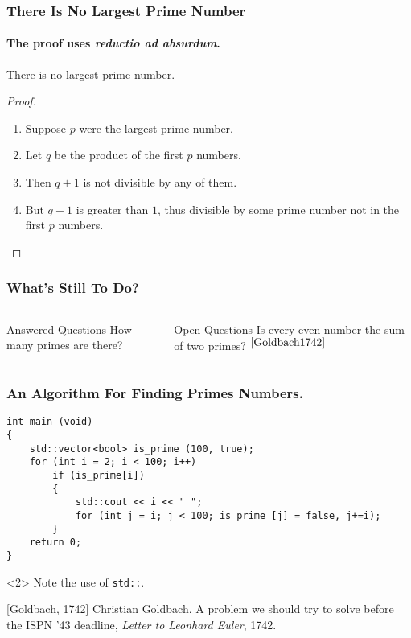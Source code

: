 \documentclass{beamer}
\begin{document}
\begin{frame}[t]
  \frametitle{There Is No Largest Prime Number}
  \framesubtitle{The proof uses \textit{reductio ad absurdum}.}
  \begin{theorem}
    There is no largest prime number.
  \end{theorem}
  \begin{proof}
    \begin{enumerate}
    \item<1-> Suppose $p$ were the largest prime number.
    \item<2-> Let $q$ be the product of the first $p$ numbers.
    \item<3-> Then $q + 1$ is not divisible by any of them.
    \item<1-> But $q + 1$ is greater than $1$, thus divisible by some prime
      number not in the first $p$ numbers.\qedhere 
    \end{enumerate}
  \end{proof}
\end{frame}

\begin{frame}
  \frametitle{What’s Still To Do?}
  \begin{columns}[t] %
    \begin{block}{Answered Questions}
      How many primes are there?
    \end{block}
    \begin{block}{Open Questions}
      Is every even number the sum of two primes?
      $^{\cite{Goldbach1742}}$
    \end{block}
  \end{columns}
\end{frame}

\begin{frame}[fragile] %
  \frametitle{An Algorithm For Finding Primes Numbers.}
\begin{verbatim} 
int main (void)
{
    std::vector<bool> is_prime (100, true);
    for (int i = 2; i < 100; i++)
        if (is_prime[i])
        {
            std::cout << i << " ";
            for (int j = i; j < 100; is_prime [j] = false, j+=i);
        }
    return 0;
}
\end{verbatim}
  \begin{uncoverenv}<2>
  Note the use of \verb|std::|.
\end{uncoverenv}
\end{frame}

\begin{thebibliography}{10}
[Goldbach, 1742]
  Christian Goldbach.
  \newblock A problem we should try to solve before the ISPN ’43 deadline,
  \newblock \emph{Letter to Leonhard Euler}, 1742.
\end{thebibliography}
\end{document}
